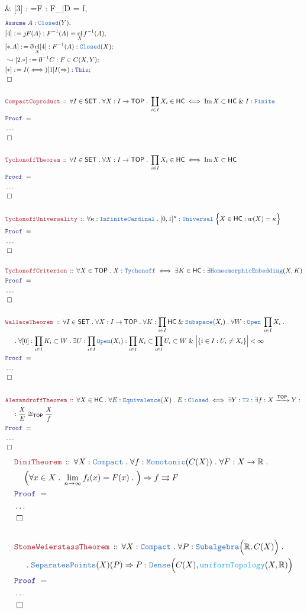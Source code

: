 \documentclass[12pt]{scrartcl}
\newcommand{\TYPE}[1]{\textcolor{NavyBlue}{\mathtt{#1}}}
\newcommand{\FUNC}[1]{\textcolor{Cerulean}{\mathtt{#1}}}
\newcommand{\LOGIC}[1]{\textcolor{Blue}{\mathtt{#1}}}
\newcommand{\THM}[1]{\textcolor{Maroon}{\mathtt{#1}}}
\renewcommand{\.}{\; . \;}
\newcommand{\de}{: \kern 0.1pc =}
\newcommand{\Theorem}[2]{& \THM{#1} \, :: \, #2 \\ & \Proof = \\ }
\newcommand{\NewLine}{\\ & \kern 1pc}
\newcommand{\Page}[1]{ \begin{align*} #1 \end{align*}   }
\newcommand{ \bd }{ \ByDef }
\newcommand{\NoProof}{ & \ldots \\ \EndProof}
\renewcommand{\And}{\; \& \;}
\newcommand{\Imply}{\Rightarrow}
\newcommand{\Reals}{\mathbb{R} }
\DeclareMathOperator*{\im}{Im}
\newcommand{\Arrow}{\xrightarrow}
\newcommand{\Say}[3]{& #1 \de #2 : #3, \\}
\newcommand{\Conclude}[3]{& #1 \de #2 : #3; \\}
\newcommand{\DeriveConclude}[3]{& \leadsto #1 \de #2 : #3 ; \\}
\newcommand{\Assume}[2]{& \LOGIC{Assume} \; #1 : #2, \\}
\newcommand{\QED}{\; \square}
\newcommand{\EndProof}{& \QED \\}
\newcommand{\ByDef}{\eth}
\newcommand{\ByConstr}{\jmath}
\newcommand{\Proof}{\LOGIC{Proof} \; }
\newcommand{\SET}{\mathsf{SET}}
\DeclareMathOperator*{\cl}{cl}
\newcommand{\TOP}{\mathsf{TOP}}
\newcommand{\HC}{\mathsf{HC}}
\begin{document}
{	\Say{[3]}{\ByConstr F}{F_{|D} = f}
}\Page{
	\Assume{A}{\TYPE{Closed}(Y)}
	\Say{[4]}{\ByConstr F(A)}{F^{-1}(A) = \cl_X f^{-1}(A)}
	\Conclude{[*.A]}{\bd \cl_X [4]}{ F^{-1}(A) : \TYPE{Closed}(X) }
	\DeriveConclude{[2.*]}{\bd^{-1} C}{F \in C(X,Y)}
	\Conclude{[*]}{I(\iff)[1]I(\Imply)}{\LOGIC{This}}
	\EndProof
	\\
	\Theorem{CompactCoproduct}
	{
		\forall I \in \SET \.
		\forall X : I \to \TOP \.
		\coprod_{i \in I} X_i \in \HC  
		\iff
		\im X \subset \HC \And I : \TYPE{Finite}
	}
	\NoProof
	\\
	\Theorem{TychonoffTheorem}
	{
		\forall I \in \SET \.
		\forall X : I \to \TOP \.
		\prod_{i \in I} X_i \in \HC \iff \im X \subset \HC   
	}
	\NoProof
	\\
	\Theorem{TychonoffUniversality}
	{
		\forall \kappa : \TYPE{InfiniteCardinal} \. 
		[0,1]^\kappa : \TYPE{Universal} \;  \Big\{ X \in \HC : w(X) = \kappa \Big\}
	}
	\NoProof
	\\
	\Theorem{TychonoffCriterion}
	{
		\forall X  \in \TOP \.
		X : \TYPE{Tychonoff} 
		\iff
		\exists K \in \HC : \exists \TYPE{HomeomorphicEmbedding}(X,K)
	}
	\NoProof
	\\
	\Theorem{WallaceTheorem}
	{
		\forall I \in \SET \.
		\forall X : I \to \TOP  \. 
		\forall K : \prod_{i \in I} \HC \And \TYPE{Subspace}(X_i) \.
		\forall W : \TYPE{Open} \; \prod_{i \in I} X_i \. \NewLine \. 
		\forall [0] : \prod_{i \in I} K_i \subset W \.
		\exists U : \prod_{i \in I} \TYPE{Open}(X_i) :
		\prod_{i \in I} K_i \subset \prod_{i \in I} U_i \subset W \And
		\Big|\{ i \in I : U_i \neq X_i\}\Big| < \infty
	}
	\NoProof
	\\
	\Theorem{AlexandroffTheorem}
	{
		\forall X \in \HC \.
		\forall E : \TYPE{Equivalence}(X) \.
		E : \TYPE{Closed} \iff 
		\exists Y : \TYPE{T2} :
		\exists f : X \Arrow{\TOP} Y :
		\NewLine :
		\frac{X}{E} \cong_{\TOP} \frac{X}{f}
	}
	\NoProof
}
\Page{
	\Theorem{DiniTheorem}
	{
		\forall X : \TYPE{Compact} \.
		\forall f : \TYPE{Monotonic}( C(X) ) \.
		\forall F : X \to \Reals \. \NewLine
		\Big(
			\forall x \in X \.
			\lim_{n \to \infty} f_i(x) = F(x) \.
		\Big) \Imply
		f \rightrightarrows F
	}
	\NoProof
	\\
	\Theorem{StoneWeierstassTheorem}
	{
		\forall X : \TYPE{Compact} \.
		\forall P : \TYPE{Subalgebra}\Big( \Reals, C(X) \Big) \. \NewLine \.
		\TYPE{SeparatesPoints}(X)(P) \Imply  P : \TYPE{Dense}\Big( C(X), \FUNC{uniformTopology}(X,\Reals) \Big)
	}
	\NoProof
}
\newpage
\end{document}
